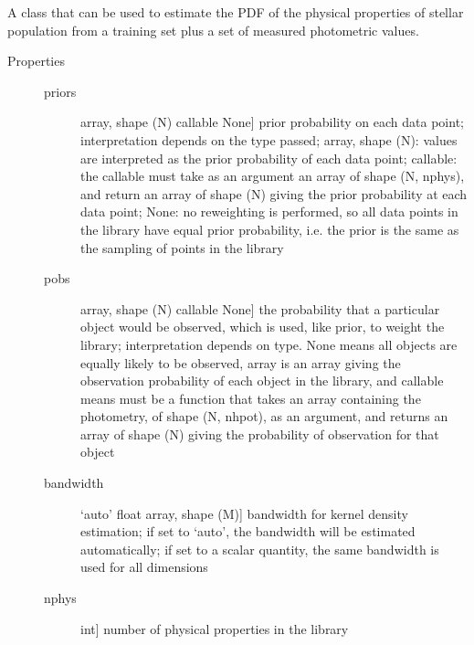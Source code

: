 \documentclass[letterpaper,10pt,english]{sphinxmanual}
\begin{document}
\begin{fulllineitems}
\label{\detokenize{bayesphot:slugpy.bayesphot.bp.bp}}
A class that can be used to estimate the PDF of the physical
properties of stellar population from a training set plus a set of
measured photometric values.
\begin{description}
\item[{Properties}] \leavevmode\begin{description}
\item[{priors}] \leavevmode{[}array, shape (N) \textbar{} callable \textbar{} None{]}
prior probability on each data point; interpretation
depends on the type passed; array, shape (N): values are
interpreted as the prior probability of each data point;
callable: the callable must take as an argument an array
of shape (N, nphys), and return an array of shape (N)
giving the prior probability at each data point; None:
no reweighting is performed, so all data points in the library
have equal prior probability, i.e. the prior is the same as
the sampling of points in the library

\item[{pobs}] \leavevmode{[}array, shape (N) \textbar{} callable \textbar{} None{]}
the probability that a particular object would be observed,
which is used, like prior, to weight the library;
interpretation depends on type. None means all objects are
equally likely to be observed, array is an array giving the
observation probability of each object in the library, and
callable means must be a function that takes an array
containing the photometry, of shape (N, nhpot), as an
argument, and returns an array of shape (N) giving the
probability of observation for that object

\item[{bandwidth}] \leavevmode{[}‘auto’ \textbar{} float \textbar{} array, shape (M){]}
bandwidth for kernel density estimation; if set to
‘auto’, the bandwidth will be estimated automatically; if
set to a scalar quantity, the same bandwidth is used for all
dimensions

\item[{nphys}] \leavevmode{[}int{]}
number of physical properties in the library


\end{description}
\end{description}
\end{fulllineitems}
\end{document}
